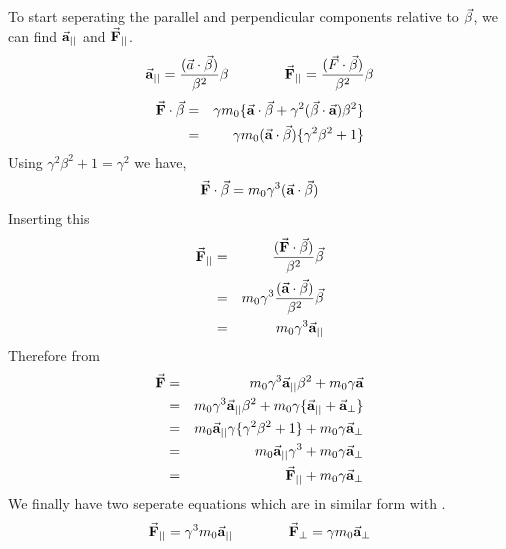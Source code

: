 \documentclass[a4paper,oneside,12pt]{report}
\numberwithin{equation}{chapter}
\begin{document}
To start seperating the parallel and perpendicular components relative to $\vec{\beta}$, we can find $\vec{\textbf{a}}_{||}$ and $\vec{\textbf{F}}_{||}$.
\begin{equation} \label{eq:a_F_parallels}
    \begin{aligned}
        \vec{\textbf{a}}_{||} = \frac{(\vec{a} \cdot \vec{\beta})}{\beta^2}\beta 
    \end{aligned}
    \qquad \qquad
    \begin{aligned}
        \vec{\textbf{F}}_{||} = \frac{(\vec{F} \cdot \vec{\beta})}{\beta^2}\beta 
    \end{aligned}
\end{equation}
\begin{eqnarray*}
    \vec{\textbf{F}} \cdot \vec{\beta} &=& \gamma m_0 \{ \vec{\textbf{a}} \cdot \vec{\beta} + \gamma^2(\vec{\beta} \cdot \vec{\textbf{a}})\beta^2 \} \\
                                &=& \gamma m_0 (\vec{\textbf{a}} \cdot \vec{\beta}) \{ \gamma^2\beta^2  + 1\} 
\end{eqnarray*}
Using $\gamma^2 \beta^2 + 1 = \gamma^2 $ we have,
\begin{equation*}
    \vec{\textbf{F}} \cdot \vec{\beta} = m_0 \gamma^3 (\vec{\textbf{a}} \cdot \vec{\beta} )
\end{equation*}
Inserting this
\begin{eqnarray}
    \vec{\textbf{F}}_{||} &=& \frac{(\vec{\textbf{F}} \cdot \vec{\beta})}{\beta^2} \vec{\beta} \nonumber \\
                        &=& m_0 \gamma^3 \frac{(\vec{\textbf{a}} \cdot \vec{\beta} )}{\beta^2} \vec{\beta} \nonumber \\
                        &=& m_0 \gamma^3 \vec{\textbf{a}}_{||} \label{eq:Frel_parallel}
\end{eqnarray}
Therefore from 
\begin{eqnarray*}
    \vec{\textbf{F}}  &=& m_0 \gamma^3 \vec{\textbf{a}}_{||} \beta^2 + m_0 \gamma \vec{\textbf{a}} \\
                    &=& m_0 \gamma^3 \vec{\textbf{a}}_{||} \beta^2 + m_0 \gamma \{ \vec{\textbf{a}}_{||} +  \vec{\textbf{a}}_{\perp} \} \\
                    &=& m_0 \vec{\textbf{a}}_{||} \gamma \{ \gamma^2\beta^2 + 1 \} + m_0 \gamma \vec{\textbf{a}}_{\perp} \\
                    &=& m_0 \vec{\textbf{a}}_{||} \gamma^3 + m_0 \gamma \vec{\textbf{a}}_{\perp} \\
                    &=& \vec{\textbf{F}}_{||} + m_0 \gamma \vec{\textbf{a}}_{\perp}
\end{eqnarray*}
We finally have two seperate equations which are in similar form with .
\begin{equation} \label{eq:Frel_para_and_perp}
    \begin{aligned}
        \vec{\textbf{F}}_{||} = \gamma^3  m_0 \vec{\textbf{a}}_{||}
    \end{aligned}
    \qquad \qquad
    \begin{aligned}
        \vec{\textbf{F}}_{\perp} = \gamma  m_0\vec{\textbf{a}}_{\perp}
    \end{aligned}
\end{equation}
\end{document}
